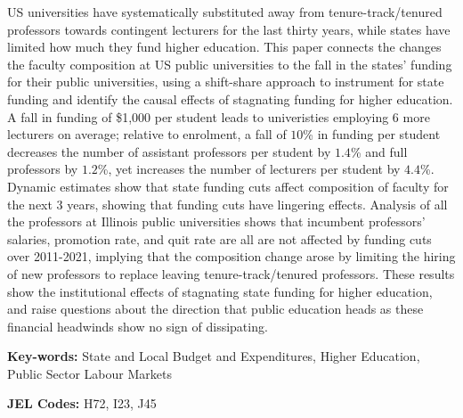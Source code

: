 US universities have systematically substituted away from tenure-track/tenured professors towards contingent lecturers for the last thirty years, while states have limited how much they fund higher education.
This paper connects the changes the faculty composition at US public universities to the fall in the states' funding for their public universities, using a shift-share approach to instrument for state funding and identify the causal effects of stagnating funding for higher education.
A fall in funding of \$1,000 per student leads to univeristies employing 6 more lecturers on average; relative to enrolment, a fall of $10$\% in funding per student decreases the number of assistant professors per student by $1.4$\% and full professors by $1.2$\%, yet increases the number of lecturers per student by $4.4$\%.
Dynamic estimates show that state funding cuts affect composition of faculty for the next 3 years, showing that funding cuts have lingering effects.
Analysis of all the professors at Illinois public universities shows that incumbent professors' salaries, promotion rate, and quit rate are all are not affected by funding cuts over 2011-2021, implying that the composition change arose by limiting the hiring of new professors to replace leaving tenure-track/tenured professors.
These results show the institutional effects of stagnating state funding for higher education, and raise questions about the direction that public education heads as these financial headwinds show no sign of dissipating.

\vfill
\noindent
\textbf{Key-words:}
State and Local Budget and Expenditures,
Higher Education,
Public Sector Labour Markets

\vspace{0.1cm}
\noindent
\textbf{JEL Codes:} H72, I23, J45
